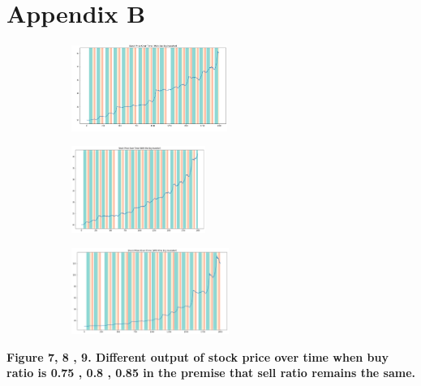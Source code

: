 \documentclass[a4paper, 12pt]{article}
\begin{document}
\section*{Appendix B}
\begin{figure}[h]
    \centering
    \begin{subfigure}{0.3\textwidth}
        \centering
        \includegraphics[height=80pt,width=\textwidth]{p1.png}
        \label{fig:my_label7}
    \end{subfigure}
    \hfill
    \begin{subfigure}{0.3\textwidth}
        \centering
        \includegraphics[height=80pt,width=\textwidth]{p2.png}
        \label{fig:my_label8}
    \end{subfigure}
    \hfill
    \begin{subfigure}{0.3\textwidth}
        \centering
        \includegraphics[height=80pt,width=\textwidth]{p3.png}
        \label{fig:my_label9}
    \end{subfigure}
\end{figure} 


\textbf{Figure 7, 8 , 9. Different output of stock price over time when buy ratio is 0.75 , 0.8 , 0.85 in the premise that sell ratio remains the same.}\par
\end{document}
